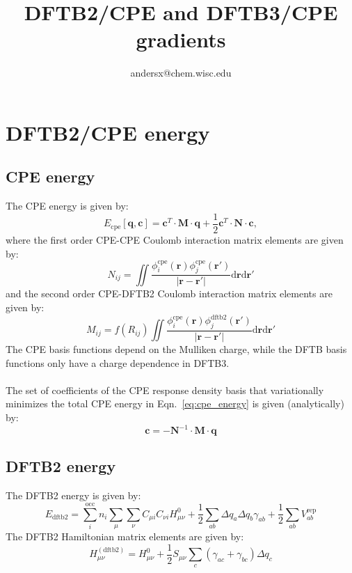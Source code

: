 \documentclass{article}
\title{DFTB2/CPE and DFTB3/CPE gradients}
\author{andersx@chem.wisc.edu}
\numberwithin{equation}{section}
\begin{document}
\section{DFTB2/CPE energy}
\subsection{CPE energy}
The CPE energy is given by:\cite{cpekaminski}
\begin{equation}
    E_{\mathrm{cpe}}\left[\mathbf{q}, \mathbf{c}\right] = \mathbf{c}^T \cdot \mathbf{M} \cdot \mathbf{q} + \frac{1}{2} \mathbf{c}^T \cdot \mathbf{N} \cdot \mathbf{c},\label{eq:cpe_energy}
\end{equation}
where the first order CPE-CPE Coulomb interaction matrix elements are given by:
\begin{equation}
    N_{ij} = \iint \frac{\phi_i^\mathrm{cpe}\left(\mathbf{r}\right)\phi_j^\mathrm{cpe}\left(\mathbf{r'}\right)}{\left| \mathbf{r} - \mathbf{r'}\right|} \mathrm{d}\mathbf{r}\mathrm{d}\mathbf{r'}
\end{equation}
and the second order CPE-DFTB2 Coulomb interaction matrix elements are given by:
\begin{equation}
    M_{ij} = f(R_{ij})\iint \frac{\phi_i^\mathrm{cpe}\left(\mathbf{r}\right)\phi_j^\mathrm{dftb2}\left(\mathbf{r'}\right)}{\left| \mathbf{r} - \mathbf{r'}\right|} \mathrm{d}\mathbf{r}\mathrm{d}\mathbf{r'}
\end{equation}
The CPE basis functions depend on the Mulliken charge, while the DFTB basis functions only have a charge dependence in DFTB3.
\\\\The set of coefficients of the CPE response density basis that variationally minimizes the total CPE energy in Eqn.~\ref{eq:cpe_energy} is given (analytically) by:
\begin{equation}
    \mathbf{c}= -\mathbf{N}^{-1} \cdot \mathbf{M} \cdot \mathbf{q}
\end{equation}
\subsection{DFTB2 energy}
The DFTB2 energy is given by:\cite{dftb2}
\begin{equation}
    E_\mathrm{dftb2} = \sum_i^\mathrm{occ} n_i  \sum_\mu \sum_\nu C_{\mu i}  C_{\nu i} H^0_{\mu\nu} + \frac{1}{2} \sum_{ab} \Delta q_a \Delta q_b \gamma_{ab}+ \frac{1}{2} \sum_{ab} V^\mathrm{rep}_{ab} %
\end{equation}
The DFTB2 Hamiltonian matrix elements are given by:\cite{dftb2}
\begin{equation}
    H_{\mu\nu}^{\mathrm{(dftb2)}} = H^0_{\mu\nu} + \frac{1}{2}S_{\mu\nu} \sum_c \left( \gamma_{ac} + \gamma_{bc} \right)\Delta q_c 
\end{equation}
\end{document}
